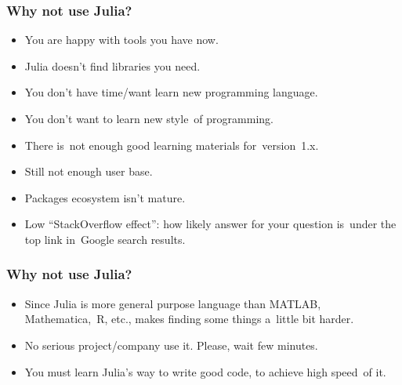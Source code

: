 \documentclass[10pt,t]{beamer}
\begin{document}
\begin{frame}
  \frametitle{Why not use Julia?}


  \begin{itemize}
    \RaggedRight

  \item You are happy with tools you have now.

  \item Julia doesn't find libraries you need.

  \item You don't have time/want learn new programming language.

  \item You don't want to learn new style~of programming.

  \item There is~not enough good learning materials for~version~1.x.

  \item Still not enough user base.

  \item Packages ecosystem isn't mature.

  \item Low ``StackOverflow effect'': how likely answer for your
    question is~under the top link in~Google search results.

  \end{itemize}

\end{frame}





\begin{frame}
  \frametitle{Why not use Julia?}


  \begin{itemize}
    \RaggedRight

  \item Since Julia is more general purpose language than MATLAB,
    Mathematica,~R, etc., makes finding some things a~little bit
    harder.

  \item No serious project/company use it. Please, \alert{wait} few
    minutes.

  \item You \alert{must} learn Julia's way to write good code, to
    achieve high speed~of it.

  \end{itemize}

\end{frame}
\end{document}
